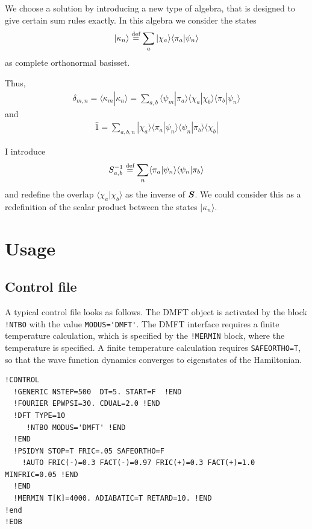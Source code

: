 \documentclass[11pt,a4paper]{report}
\begin{document}
We choose a solution by introducing a new type of algebra, that is
designed to give certain sum rules exactly. 
In this algebra we consider the states
\begin{eqnarray}
|\kappa_n\rangle\stackrel{\text{def}}{=}
\sum_{a}|\chi_a\rangle\langle\pi_a|\psi_n\rangle
\end{eqnarray}
as complete orthonormal basisset.

Thus, 
\begin{eqnarray}
\delta_{m,n}=\langle\kappa_m|\kappa_n\rangle
=\sum_{a,b}\langle\psi_m|\pi_a\rangle\langle\chi_a|
\chi_b\rangle\langle\pi_b|\psi_n\rangle
\end{eqnarray}
and
\begin{eqnarray}
\hat{1}=\sum_{a,b,n}|\chi_a\rangle\langle\pi_a|\psi_n\rangle
\langle\psi_n|\pi_b\rangle\langle\chi_b|
\end{eqnarray}

I introduce
\begin{eqnarray}
S^{-1}_{a,b}\stackrel{\text{def}}{=} \sum_{n}\langle\pi_a|\psi_n\rangle\langle\psi_n|\pi_b\rangle
\end{eqnarray}
and redefine the overlap $\langle\chi_a|\chi_b\rangle$ as the inverse
of $\bm{S}$. We could consider this as a redefinition of the scalar
product between the states $|\kappa_n\rangle$.




\section{Usage}
\subsection{Control file}
A typical control file looks as follows. The DMFT object is activated
by the block \verb|!NTBO| with the value \verb|MODUS='DMFT'|. The DMFT
interface requires a finite temperature calculation, which is
specified by the \verb|!MERMIN| block, where the temperature is
specified.  A finite temperature calculation requires
\verb|SAFEORTHO=T|, so that the wave function dynamics converges to
eigenstates of the Hamiltonian.
\begin{verbatim}
!CONTROL
  !GENERIC NSTEP=500  DT=5. START=F  !END 
  !FOURIER EPWPSI=30. CDUAL=2.0 !END
  !DFT TYPE=10  
     !NTBO MODUS='DMFT' !END   
  !END 
  !PSIDYN STOP=T FRIC=.05 SAFEORTHO=F
    !AUTO FRIC(-)=0.3 FACT(-)=0.97 FRIC(+)=0.3 FACT(+)=1.0 MINFRIC=0.05 !END
  !END
  !MERMIN T[K]=4000. ADIABATIC=T RETARD=10. !END
!end
!EOB
\end{verbatim}
\end{document}
